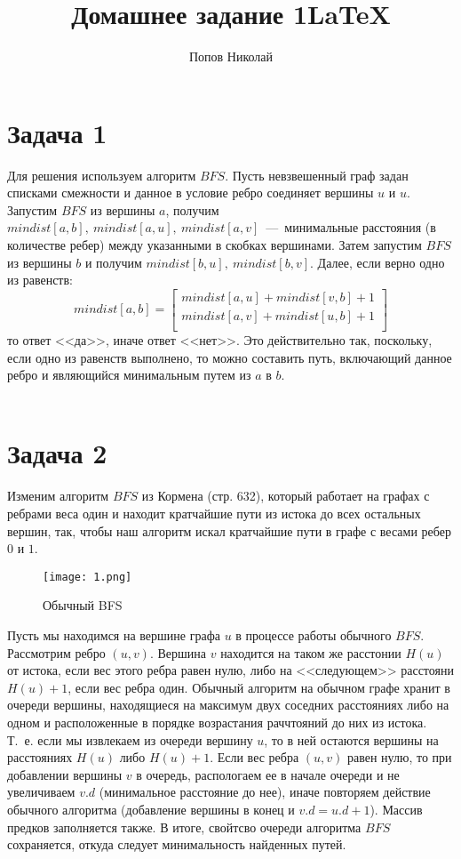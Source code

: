 \documentclass[a4paper,12pt]{article} %
\author{Попов Николай}
\title{Домашнее задание 1\LaTeX{}}
\begin{document}
\section*{Задача 1}
Для решения используем алгоритм $BFS$. Пусть невзвешенный граф задан списками смежности и данное в условие ребро соединяет вершины $u$ и $u$. Запустим $BFS$ из вершины $a$, получим $mindist[a,b],~mindist[a,u], ~mindist[a,v]$~---~минимальные расстояния (в количестве ребер) между указанными в скобках вершинами. Затем запустим $BFS$ из вершины $b$ и получим $mindist[b,u], ~mindist[b,v]$. Далее, если верно одно из равенств:
\[
mindist[a,b]=
\left[
\begin{matrix}
mindist[a,u]+mindist[v,b]+1\\
mindist[a,v]+mindist[u,b]+1\\
\end{matrix}
\right]
\]
то ответ <<да>>, иначе ответ <<нет>>. Это действительно так, поскольку, если одно из равенств выполнено, то можно составить путь, включающий данное ребро и являющийся минимальным путем из $a$ в $b$.\\  
  \\

\section*{Задача 2}

Изменим алгоритм $BFS$ из Кормена (стр. 632), который работает на графах с ребрами веса один и находит кратчайшие пути из истока до всех остальных вершин, так, чтобы наш алгоритм искал кратчайшие пути в графе с весами ребер $0$ и $1$. 

\begin{figure}[h]
\centering
\texttt{[image: 1.png]}
\caption{Обычный BFS}
\end{figure}
 
Пусть мы находимся на вершине графа $u$ в процессе работы обычного $BFS$. Рассмотрим ребро $(u,v)$. Вершина $v$ находится на таком же расстонии $H(u)$ от истока, если вес этого ребра равен нулю, либо на <<следующем>> расстояни $H(u)+1$, если вес ребра один. Обычный алгоритм на обычном графе хранит в очереди вершины, находящиеся на максимум двух соседних расстояниях либо на одном и расположенные в порядке возрастания раччтояний до них из истока. Т.~е. если мы извлекаем из очереди вершину $u$, то в ней остаются вершины на расстояниях $H(u)$ либо $H(u)+1$. Если вес ребра $(u,v)$ равен нулю, то при добавлении вершины $v$ в очередь, распологаем ее в начале очереди и не увеличиваем $v.d$ (минимальное расстояние до нее), иначе повторяем действие обычного алгоритма (добавление вершины в конец и $v.d  = u.d + 1$). Массив предков заполняется также. В итоге, свойтсво очереди алгоритма $BFS$ сохраняется, откуда следует минимальность найденных путей.\\
\end{document}
